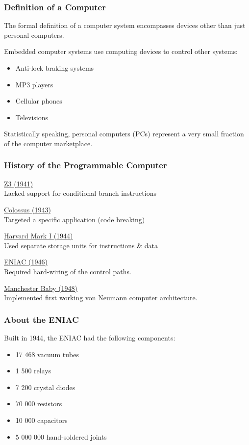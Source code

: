 \begin{frame}
\frametitle{Definition of a Computer}

The formal definition of a computer system encompasses devices other than just personal computers.

Embedded computer systems use computing devices to control other systems:

\begin{itemize}
\item Anti-lock braking systems
\item MP3 players
\item Cellular phones
\item Televisions
\end{itemize}

Statistically speaking, personal computers (PCs) represent a very small fraction of the computer marketplace.

\end{frame}

\begin{frame}
\frametitle{History of the Programmable Computer}
\underline{Z3 (1941)}\\
\quad Lacked support for conditional branch instructions

\underline{Colossus (1943)}\\
\quad Targeted a specific application (code breaking)

\underline{Harvard Mark I (1944)}\\
\quad Used separate storage units for instructions \& data

\underline{ENIAC (1946)}\\
\quad Required hard-wiring of the control paths.

\underline{Manchester Baby (1948)}\\
\quad Implemented first working von Neumann computer architecture.

\end{frame}

\begin{frame}
\frametitle{About the ENIAC}

Built in 1944, the ENIAC had the following components:
\begin{itemize}
	\item 17 468 vacuum tubes
	\item 1 500 relays
	\item 7 200 crystal diodes
	\item 70 000 resistors
	\item 10 000 capacitors
	\item 5 000 000 hand-soldered joints
\end{itemize}

\end{frame}

